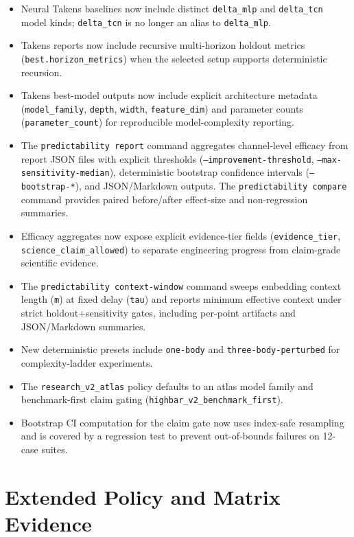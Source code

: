 \documentclass[11pt]{article}
\begin{document}
\begin{itemize}
\item Neural Takens baselines now include distinct \texttt{delta\_mlp} and \texttt{delta\_tcn} model kinds; \texttt{delta\_tcn} is no longer an alias to \texttt{delta\_mlp}.
\item Takens reports now include recursive multi-horizon holdout metrics (\texttt{best.horizon\_metrics}) when the selected setup supports deterministic recursion.
\item Takens best-model outputs now include explicit architecture metadata (\texttt{model\_family}, \texttt{depth}, \texttt{width}, \texttt{feature\_dim}) and parameter counts (\texttt{parameter\_count}) for reproducible model-complexity reporting.
\item The \texttt{predictability report} command aggregates channel-level efficacy from report JSON files with explicit thresholds (\texttt{--improvement-threshold}, \texttt{--max-sensitivity-median}), deterministic bootstrap confidence intervals (\texttt{--bootstrap-*}), and JSON/Markdown outputs. The \texttt{predictability compare} command provides paired before/after effect-size and non-regression summaries.
\item Efficacy aggregates now expose explicit evidence-tier fields (\texttt{evidence\_tier}, \texttt{science\_claim\_allowed}) to separate engineering progress from claim-grade scientific evidence.
\item The \texttt{predictability context-window} command sweeps embedding context length (\texttt{m}) at fixed delay (\texttt{tau}) and reports minimum effective context under strict holdout+sensitivity gates, including per-point artifacts and JSON/Markdown summaries.
\item New deterministic presets include \texttt{one-body} and \texttt{three-body-perturbed} for complexity-ladder experiments.
\item The \texttt{research\_v2\_atlas} policy defaults to an atlas model family and benchmark-first claim gating (\texttt{highbar\_v2\_benchmark\_first}).
\item Bootstrap CI computation for the claim gate now uses index-safe resampling and is covered by a regression test to prevent out-of-bounds failures on 12-case suites.
\end{itemize}

\section{Extended Policy and Matrix Evidence}
\end{document}
